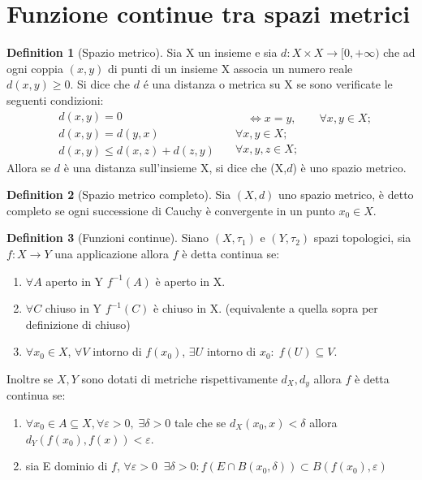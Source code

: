 \documentclass[leqno]{article}
\theoremstyle{definition}
\newtheorem{definition}{Definition}[section]
\numberwithin{equation}{section}
\theoremstyle{remark}
\begin{document}
	\section{Funzione continue tra spazi metrici}
	\begin{definition}[Spazio metrico]
		Sia X un insieme e sia $d:X\times X \rightarrow [0,+ \infty)$ che ad ogni coppia $(x,y)$ di punti di un insieme X associa un numero reale $d(x,y)\ge 0$. Si dice che $d$ é una distanza o metrica su X se sono verificate le seguenti condizioni: 
		\begin{equation} 
			\begin{split}
				&d(x,y) = 0 \\
				&d(x,y)=d(y,x)\\
				&d(x,y)\le d(x,z) + d(z,y)
			\end{split}
			\quad
			\begin{split}
				\quad \Leftrightarrow x = y, \quad \quad \forall x,y \in X; \\
				\forall x,y \in X;\\
				\forall x,y,z \in X;
			\end{split}
		\end{equation}
		Allora se $d$ è una distanza sull'insieme X, si dice che (X,$d$) è uno spazio metrico.
	\end{definition}
	\begin{definition}[Spazio metrico completo]
		Sia $(X,d)$ uno spazio metrico, è detto completo se ogni successione di Cauchy è convergente in un punto $x_0 \in X$.
	\end{definition}
	\begin{definition}[Funzioni continue]
		Siano $(X,\tau_1)$ e $(Y,\tau_2)$ spazi topologici, sia $f: X\rightarrow Y$ una applicazione allora $f$ è detta continua se:
		\begin{enumerate}
			\item $\forall A$ aperto in Y $f^{-1}(A)$ è aperto in X.
			\item $\forall C$ chiuso in Y $f^{-1}(C)$ è chiuso in X. (equivalente a quella sopra per definizione di chiuso)
			\item $\forall x_0 \in X$, $\forall V$ intorno di $f(x_0)$, $\exists U$ intorno di $x_0 : \; f(U)\subseteq V$.
		\end{enumerate}
		Inoltre se $X,Y$ sono dotati di metriche rispettivamente $d_X, d_y$ allora $f$ è detta continua se:
		\begin{enumerate}
			\item $\forall x_0 \in A \subseteq X, \forall \varepsilon > 0, \; \exists \delta > 0$ tale che se $d_X(x_0,x)< \delta$ allora $d_Y(f(x_0),f(x)) < \varepsilon$.
			\item sia E dominio di $f$, $\forall \varepsilon > 0 \; \; \exists \delta > 0 : f(E \cap B(x_0,\delta)) \subset B(f(x_0),\varepsilon)$ 
		\end{enumerate}
	\end{definition}
\end{document}
